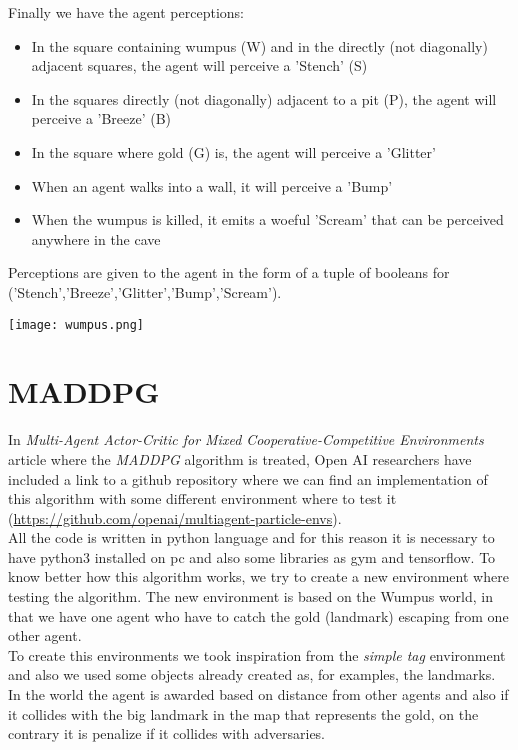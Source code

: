 \documentclass[]{report}
\begin{document}
\vspace{7 mm}
Finally we have the agent perceptions:
\vspace{5 mm}

\begin{itemize}
  \item In the square containing wumpus (W) and in the directly (not diagonally) adjacent squares, the agent will perceive a 'Stench' (S)
  \item In the squares directly (not diagonally) adjacent to a pit (P), the agent will perceive a 'Breeze' (B)
  \item In the square where  gold (G) is, the agent will perceive a 'Glitter'
  \item When an agent walks into a wall, it will perceive a 'Bump'
  \item When the wumpus is killed, it emits a woeful 'Scream' that can be perceived anywhere in the cave
\end{itemize}

Perceptions are given to the agent in the form of a tuple of booleans for
('Stench','Breeze','Glitter','Bump','Scream').

\vspace{10 mm}

\begin{center}
	\texttt{[image: wumpus.png]}
\end{center}
 
\vspace{30 mm}

\section{MADDPG}
In \emph{Multi-Agent Actor-Critic for Mixed Cooperative-Competitive Environments} article where the \emph{MADDPG} algorithm is treated, Open AI researchers have included a link to a github repository where we can find an implementation of this algorithm with some different environment where to test it (\url{https://github.com/openai/multiagent-particle-envs}).\\ 
All the code is written in python language and for this reason it is necessary to have python3 installed on pc and also some libraries as gym and tensorflow.
To know better how this algorithm works, we try to create a new environment where testing the algorithm.
The new environment is based on the Wumpus world, in that we have one agent who have to catch the gold (landmark) escaping from one other agent.\\
To create this environments we took inspiration from the \emph{simple tag} environment and also we used some objects already created as, for examples, the landmarks.
In the world the agent is awarded based on distance from other agents and also if it collides with the big landmark in the map that represents the gold, on the contrary it is penalize if it collides with adversaries.
\end{document}
